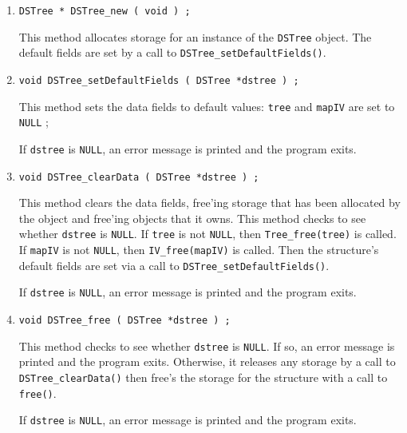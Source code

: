\begin{enumerate}
\item
\begin{verbatim}
DSTree * DSTree_new ( void ) ;
\end{verbatim}
This method allocates storage for an instance of 
the {\tt DSTree} object. 
The default fields are set by a call to 
{\tt DSTree\_setDefaultFields()}.
\item
\begin{verbatim}
void DSTree_setDefaultFields ( DSTree *dstree ) ;
\end{verbatim}
This method sets the data fields to default values:
{\tt tree} and {\tt mapIV} are set to {\tt NULL} ;
\par {}
If {\tt dstree} is {\tt NULL},
an error message is printed and the program exits.
\item
\begin{verbatim}
void DSTree_clearData ( DSTree *dstree ) ;
\end{verbatim}
This method clears the data fields, free'ing storage that has
been allocated by the object and free'ing objects that it owns.
This method checks to see whether {\tt dstree} is {\tt NULL}.
If {\tt tree} is not {\tt NULL}, then {\tt Tree\_free(tree)} is
called.
If {\tt mapIV} is not {\tt NULL}, then {\tt IV\_free(mapIV)} is
called.
Then the structure's default fields are set
via a call to {\tt DSTree\_setDefaultFields()}.
\par {}
If {\tt dstree} is {\tt NULL},
an error message is printed and the program exits.
\item
\begin{verbatim}
void DSTree_free ( DSTree *dstree ) ;
\end{verbatim}
This method checks to see whether {\tt dstree} is {\tt NULL}.
If so, an error message is printed and the program exits.
Otherwise, it releases any storage by a call to 
{\tt DSTree\_clearData()} then free's the storage for the 
structure with a call to {\tt free()}.
\par {}
If {\tt dstree} is {\tt NULL},
an error message is printed and the program exits.
\end{enumerate}
\par
